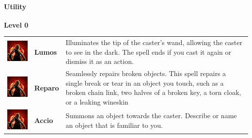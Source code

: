 \paragraph{Utility} 
\textbf{Level 0 } 
\begin{tabular}{ m{4cm}m{3cm}m{6cm} } 
	\includegraphics[width=4cm]{../Pictures/Gameplay/Spells/Icon/spell_icon.png} & \textbf{Lumos} & Illuminates the tip of the caster's wand, allowing the caster to see in the dark. The spell ends if you cast it again or dismiss it as an action.\\ 
	\includegraphics[width=4cm]{../Pictures/Gameplay/Spells/Icon/spell_icon.png} & \textbf{Reparo} & Seamlessly repairs broken objects. This spell repairs a single break or tear in an object you touch, such as a broken chain link, two halves of a broken key, a torn cloak, or a leaking wineskin \\ 
	\includegraphics[width=4cm]{../Pictures/Gameplay/Spells/Icon/spell_icon.png} & \textbf{Accio} &  Summons an object towards the caster. Describe or name an object that is familiar to you. \\ 
\end{tabular}

